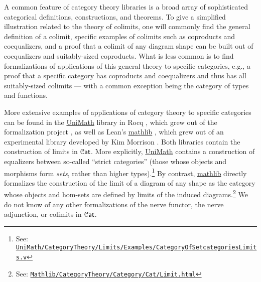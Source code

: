 \documentclass[a4paper,UKenglish,cleveref, autoref, thm-restate]{lipics-v2021}
\newcommand{\cat}[1]{\textup{\textsf{#1}}}%
\newcommand{\1}{\mathbbe{1}}
\newcommand{\2}{\mathbbe{2}}
\newcommand{\3}{\mathbbe{3}}
\newcommand{\Cat}{\mathcal{C}\cat{at}}
\newcommand{\libmathlib}{\href{https://github.com/leanprover-community/mathlib}{\textsf{mathlib}}}
\newcommand{\libunimath}{\href{https://github.com/UniMath/UniMath}{\textsf{UniMath}}}
\begin{document}
A common feature of category theory libraries is a broad array of sophisticated categorical definitions, constructions, and theorems. To give a simplified illustration related to the theory of colimits, one will commonly find the general definition of a colimit, specific examples of colimits such as coproducts and coequalizers, and a proof that a colimit of any diagram shape can be built out of coequalizers and suitably-sized coproducts. What is less common is to find formalizations of applications of this general theory to specific categories, e.g., a proof that a specific category has coproducts and coequalizers and thus has all suitably-sized colimits --- with a common exception being the category of types and functions.

More extensive examples of applications of category theory to specific categories can be found in the \libunimath{} library in Rocq \cite{UniMath}, which grew out of the formalization project \cite{AKS-Univalent}, as well as Lean's \libmathlib{} \cite{mathlib2020}, which grew out of an experimental library developed by Kim Morrison \cite{Morrison}. Both libraries contain the construction of limits in $\Cat$. More explicitly, \libunimath{} contains a construction of equalizers between so-called ``strict categories'' (those whose objects and morphisms form \emph{sets}, rather than higher types).\footnote{See: \href{https://github.com/UniMath/UniMath/blob/master/UniMath/CategoryTheory/Limits/Examples/CategoryOfSetcategoriesLimits.v}{\tt UniMath/CategoryTheory/Limits/Examples/CategoryOfSetcategoriesLimits.v}} By contrast, \libmathlib{} directly formalizes the construction of the limit of a diagram of any shape as the category whose objects and hom-sets are defined by limits of the induced diagrams.\footnote{See: \href{https://leanprover-community.github.io/mathlib4_docs/Mathlib/CategoryTheory/Category/Cat/Limit.html}{\tt Mathlib/CategoryTheory/Category/Cat/Limit.html}} We do not know of any other formalizations of the nerve functor, the nerve adjunction, or colimits in $\Cat$.
\end{document}
